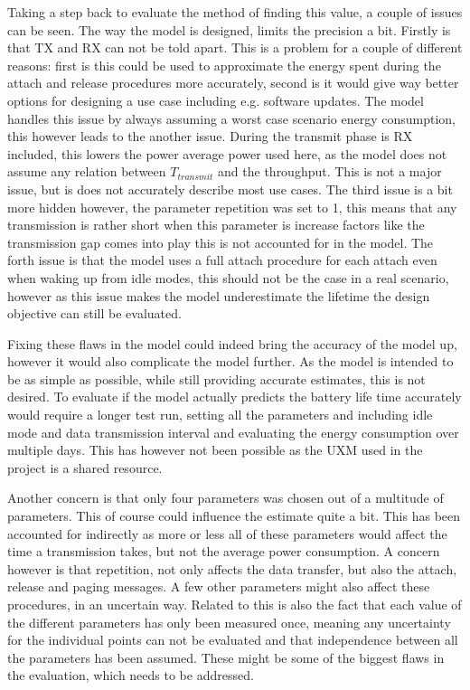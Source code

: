 Taking a step back to evaluate the method of finding this value, a couple of issues can be seen. The way the model is designed, limits the precision a bit. Firstly is that TX and RX can not be told apart. This is a problem for a couple of different reasons: first is this could be used to approximate the energy spent during the attach and release procedures more accurately, second is it would give way better options for designing a use case including e.g. software updates. The model handles this issue by always assuming a worst case scenario energy consumption, this however leads to the another issue. During the transmit phase is RX included, this lowers the power average power used here, as the model does not assume any relation between $T_{transmit}$ and the throughput. This is not a major issue, but is does not accurately describe most use cases. The third issue is a bit more hidden however, the parameter repetition was set to 1, this means that any transmission is rather short when this parameter is increase factors like the transmission gap comes into play this is not accounted for in the model. The forth issue is that the model uses a full attach procedure for each attach even when waking up from idle modes, this should not be the case in a real scenario, however as this issue makes the model underestimate the lifetime the design objective can still be evaluated.

Fixing these flaws in the model could indeed bring the accuracy of the model up, however it would also complicate the model further. As the model is intended to be as simple as possible, while still providing accurate estimates, this is not desired. To evaluate if the model actually predicts the battery life time accurately would require a longer test run, setting all the parameters and including idle mode and data transmission interval and evaluating the energy consumption over multiple days. This has however not been possible as the UXM used in the project is a shared resource. 

Another concern is that only four parameters was chosen out of a multitude of parameters. This of course could influence the estimate quite a bit. This has been accounted for indirectly as more or less all of these parameters would affect the time a transmission takes, but not the average power consumption. A concern however is that repetition, not only affects the data transfer, but also the attach, release and paging messages. A few other parameters might also affect these procedures, in an uncertain way. Related to this is also the fact that each value of the different parameters has only been measured once, meaning any uncertainty for the individual points can not be evaluated and that independence between all the parameters has been assumed. These might be some of the biggest flaws in the evaluation, which needs to be addressed.


